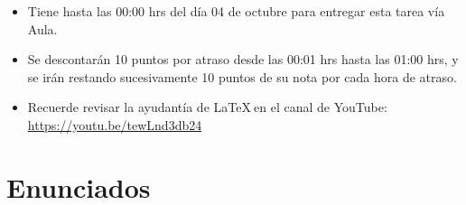 \documentclass[letterpaper,10pt]{article}
\begin{document}
\begin{itemize}
        
    \item Tiene hasta las 00:00 hrs del día 04 de octubre para entregar esta tarea vía Aula.
    
    \item Se descontarán 10 puntos por atraso desde las 00:01 hrs hasta las 01:00 hrs, y se irán restando sucesivamente 10 puntos de su nota por cada hora de atraso.
    
    \item Recuerde revisar la ayudantía de \LaTeX $~$en el canal de YouTube:
    \href{https://youtu.be/tewLnd3db24}{https://youtu.be/tewLnd3db24}
    
\end{itemize}


\section{Enunciados}
\end{document}
